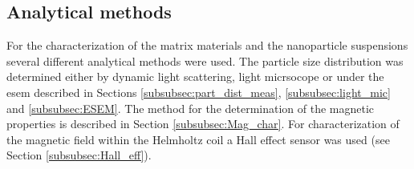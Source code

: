  

\subsection{Analytical methods}
\label{subsec:ana_met}
 For the characterization of the matrix materials and the nanoparticle suspensions several different analytical methods were used. The particle size distribution was determined either by dynamic light scattering, light micrsocope or under the \gls{esem} described in Sections \ref{subsubsec:part_dist_meas}, \ref{subsubsec:light_mic} and \ref{subsubsec:ESEM}. The method for the determination of the magnetic properties is described in Section \ref{subsubsec:Mag_char}. For characterization of the magnetic field within the Helmholtz coil a Hall effect sensor was used (see Section \ref{subsubsec:Hall_eff}).   
 
 
